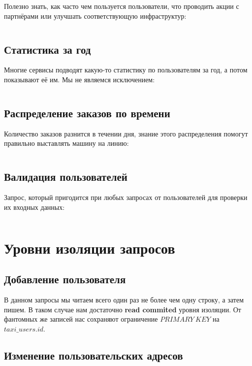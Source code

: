 \documentclass[fontsize=12pt]{article}
\begin{document}
Полезно знать, как часто чем пользуется пользователи, что проводить акции с партнёрами или улучшать соответствующую инфраструктур:

\inputminted[frame=single]{sql}{scripts/queries/payment-type-distribution.sql}

\subsection*{Статистика за год}

Многие сервисы подводят какую-то статистику по пользователям за год, а потом показывают её им. Мы не являемся исключением:

\inputminted[frame=single]{sql}{scripts/functions/user-year-statistics.sql}

\subsection*{Распределение заказов по времени}

Количество заказов разнится в течении дня, знание этого распределения помогут правильно выставлять машину на линию:

\inputminted[frame=single]{sql}{scripts/functions/rides-hour-distribution.sql}

\subsection*{Валидация пользователей}

Запрос, который пригодится при любых запросах от пользователей для проверки их входных данных:

\inputminted[frame=single]{sql}{scripts/functions/validate-user.sql}

\section{Уровни изоляции запросов}

\subsection*{Добавление пользователя}

В данном запросы мы читаем всего один раз не более чем одну строку, а затем пишем. В таком случае нам достаточно \textbf{read commited} уровня изоляции. От фантомных же записей нас сохраняют ограничение $PRIMARY\ KEY$ на $taxi\_users.id$.


\subsection*{Изменение пользовательских адресов}
\end{document}
